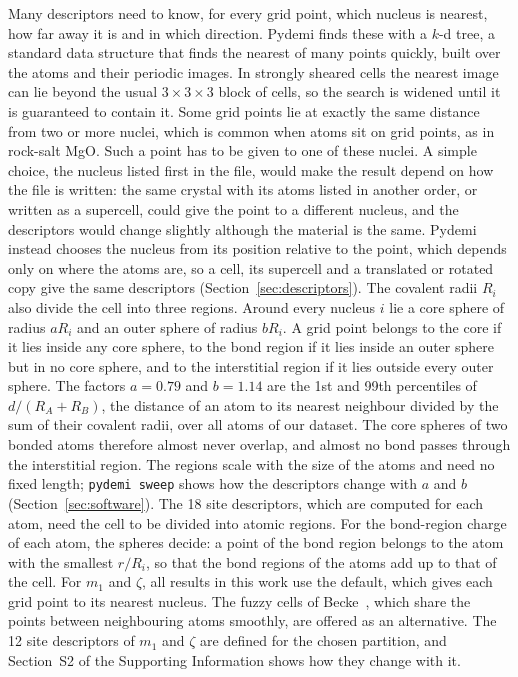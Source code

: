 \documentclass[journal=jctcce,manuscript=article,email=true]{achemso}
\newcommand{\rev}[1]{{\color{blue}#1}}
\begin{document}
Many descriptors need to know, for every grid point, which nucleus is
nearest, how far away it is and in which direction. Pydemi finds these with a
$k$-d tree, a standard data structure that finds the nearest of many points
quickly, built over the atoms and their periodic images. In strongly sheared
cells the nearest image can lie beyond the usual $3\times3\times3$ block of
cells, so the search is widened until it is guaranteed to contain it. Some grid
points lie at exactly the same distance from two or more nuclei, which is common
when atoms sit on grid points, as in rock-salt MgO. Such a point has to be given
to one of these nuclei. A simple choice, the nucleus listed first in the file,
would make the result depend on how the file is written: the same crystal with
its atoms listed in another order, or written as a supercell, could give the
point to a different nucleus, and the descriptors would change slightly although
the material is the same. Pydemi instead chooses the nucleus from its position
relative to the point, which depends only on where the atoms are, so a cell, its
supercell and a translated or rotated copy give the same descriptors
(Section~\ref{sec:descriptors}). \rev{The covalent radii $R_i$~\cite{cordero2008}
also divide the cell into three regions. Around every nucleus $i$ lie a core
sphere of radius $aR_i$ and an outer sphere of radius $bR_i$. A grid point
belongs to the core if it lies inside any core sphere, to the bond region if
it lies inside an outer sphere but in no core sphere, and to the interstitial
region if it lies outside every outer sphere. The factors $a=0.79$ and $b=1.14$
are the 1st and 99th percentiles of $d/(R_A+R_B)$, the distance of an atom to
its nearest neighbour divided by the sum of their covalent radii, over all
atoms of our dataset. The core spheres of two bonded atoms therefore almost
never overlap, and almost no bond passes through the interstitial region. The
regions scale with the size of the atoms and need no fixed length;
\texttt{pydemi sweep} shows how the descriptors change with $a$ and $b$
(Section~\ref{sec:software}).} The 18 site descriptors, which are computed for each atom, need the cell to be
divided into atomic regions. \rev{For the bond-region charge of each atom, the
spheres decide: a point of the bond region belongs to the atom with the
smallest $r/R_i$, so that the bond regions of the atoms add up to that of the
cell. For $m_1$ and $\zeta$, a}ll results in this work use the default, which
gives each grid point to its nearest nucleus. \rev{The} fuzzy cells of
Becke~\cite{becke1988}, which share the points between neighbouring atoms
smoothly, are offered as \rev{an alternative. The 12 site descriptors of $m_1$
and $\zeta$ are defined for the chosen partition, and} Section~S2 of the Supporting Information
shows how \rev{they change with it}.
\end{document}
